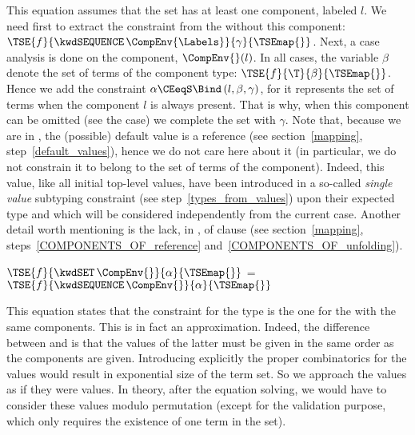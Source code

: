 This equation assumes that the set has at least one component, labeled
$l$.  We need first to extract the constraint from the
\kwdSEQUENCE{} without this component: $\TSE{f}{\kwdSEQUENCE \,
\CompEnv{\Labels}}{\gamma}{\TSEmap{}}$. Next, a case analysis is done
on the component, $\CompEnv{}(l)$. In all cases, the variable $\beta$
denote the set of terms of the component type:
$\TSE{f}{\T}{\beta}{\TSEmap{}}$. Hence we add the constraint $\alpha
\CEeqS \Bind \, (l, \beta, \gamma)$, for it represents the set of
terms when the component $l$ is always present. That is why, when this
component can be omitted (see the \kwdOPTIONAL{} case) we complete the
set with $\gamma$. Note that, because we are in \core, the (possible)
default value is a reference (see section~\ref{mapping},
step~\ref{default_values}), hence we do not care here about it (in
particular, we do not constrain it to belong to the set of terms of
the component). Indeed, this value, like all initial top-level values,
have been introduced in a so-called \emph{single value} subtyping
constraint (see step~\ref{types_from_values}) upon their expected
type and which will be considered independently from the current
case. Another detail worth mentioning is the lack, in \core, of
\kwdCOMPONENTSOF{} clause (see section~\ref{mapping},
steps~\ref{COMPONENTS_OF_reference}
and~\ref{COMPONENTS_OF_unfolding}).

\begin{center}
$\TSE{f}{\kwdSET \, \CompEnv{}}{\alpha}{\TSEmap{}}$
= $\TSE{f}{\kwdSEQUENCE \, \CompEnv{}}{\alpha}{\TSEmap{}}$
\end{center}

This equation states that the constraint for the \kwdSET{}
type is the one for the \kwdSEQUENCE{} with the same components. This
is in fact an approximation. Indeed, the difference between \kwdSET{}
and \kwdSEQUENCE{} is that the values of the latter must be given in
the same order as the components are given. Introducing explicitly the
proper combinatorics for the \kwdSET{} values would result in
exponential size of the term set. So we approach the \kwdSET{}
values as if they were \kwdSEQUENCE{} values. In theory, after the
equation solving, we would have to consider these values modulo
permutation (except for the validation purpose, which only requires
the existence of one term in the set).

